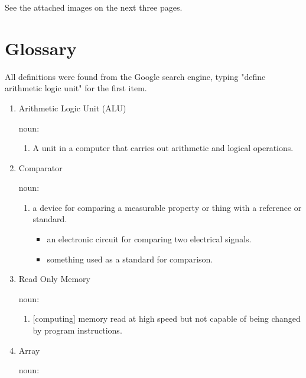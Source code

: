 \documentclass[12pt]{article}
\numberwithin{figure}{subsection}
\numberwithin{table}{subsection}
\numberwithin{equation}{subsection}
\begin{document}
See the attached images on the next three pages.



\section{Glossary}

All definitions were found from the Google search engine, typing "define arithmetic logic unit" for the first item.

\begin{enumerate}
  \item Arithmetic Logic Unit (ALU)

  noun:

  \begin{enumerate}
    \item A unit in a computer that carries out arithmetic and logical operations.
  \end{enumerate}

  \item Comparator

  noun:

  \begin{enumerate}
    \item a device for comparing a measurable property or thing with a reference or standard.

    \begin{itemize}
      \item an electronic circuit for comparing two electrical signals.
      \item something used as a standard for comparison.
    \end{itemize}
  \end{enumerate}

  \item{Read Only Memory}

  noun:

  \begin{enumerate}
    \item {[computing]} memory read at high speed but not capable of being changed by program instructions.
  \end{enumerate}

  \item{Array}

  noun:


\end{enumerate}
\end{document}
